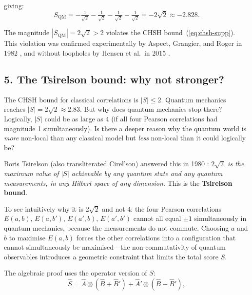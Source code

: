giving:
\begin{equation}
  S_{\mathrm{QM}}
  = -\tfrac{1}{\sqrt{2}} - \tfrac{1}{\sqrt{2}} - \tfrac{1}{\sqrt{2}} - \tfrac{1}{\sqrt{2}}
  = -2\sqrt{2} \approx -2.828.
\end{equation}

The magnitude $|S_{\mathrm{QM}}| = 2\sqrt{2} > 2$ violates the CHSH bound~(\ref{eq:chsh-supp}). This violation was confirmed experimentally by Aspect, Grangier, and Roger in 1982 \cite{aspect_1982_bell}, and without loopholes by Hensen et al.\ in 2015 \cite{hensen_2015_loophole}. 

\subsection*{5. The Tsirelson bound: why not stronger?}

The CHSH bound for classical correlations is $|S| \leq 2$. Quantum mechanics reaches $|S| = 2\sqrt{2} \approx 2.83$. But why does quantum mechanics stop there? Logically, $|S|$ could be as large as $4$ (if all four Pearson correlations had magnitude 1 simultaneously). Is there a deeper reason why the quantum world is \textit{more} non-local than any classical model but \textit{less} non-local than it could logically be?

\medskip

Boris Tsirelson (also transliterated Cirel'son) answered this in 1980 \cite{tsirelson_1980_bound}: \textit{$2\sqrt{2}$ is the maximum value of $|S|$ achievable by any quantum state and any quantum measurements, in any Hilbert space of any dimension.} This is the \textbf{Tsirelson bound}.

\medskip

To see intuitively why it is $2\sqrt{2}$ and not $4$: the four Pearson correlations $E(a,b)$, $E(a,b')$, $E(a',b)$, $E(a',b')$ cannot all equal $\pm1$ simultaneously in quantum mechanics, because the measurements do not commute. Choosing $a$ and $b$ to maximise $E(a,b)$ forces the other correlations into a configuration that cannot simultaneously be maximised---the non-commutativity of quantum observables introduces a geometric constraint that limits the total score $S$.

\medskip

The algebraic proof uses the operator version of $S$:
\begin{equation}
  \hat{S} = \hat{A}\otimes(\hat{B}+\hat{B}') + \hat{A}'\otimes(\hat{B}-\hat{B}'),
\end{equation}

